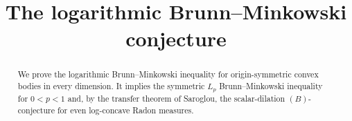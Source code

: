 \documentclass[11pt,a4paper]{amsart}
\title{The logarithmic Brunn--Minkowski conjecture}
\author{}
\date{}
\begin{document}
\begin{abstract}
We prove the logarithmic Brunn--Minkowski inequality for origin-symmetric convex bodies in every dimension. It implies the symmetric $L_p$ Brunn--Minkowski inequality for $0<p<1$ and, by the transfer theorem of Saroglou, the scalar-dilation $(B)$-conjecture for even log-concave Radon measures.
\end{abstract}

\maketitle











\printbibliography
\end{document}
